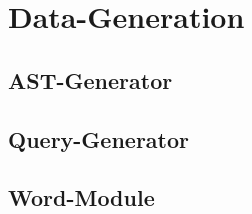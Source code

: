 \section{Data-Generation}



\subsection{AST-Generator}
\label{ast-g}
        
\subsection{Query-Generator}
\label{query-g}

\subsection{Word-Module}
\label{word-m}

